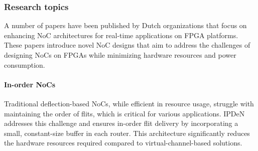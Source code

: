 \subsubsection*{\bf{Research topics}}
A number of papers have been published by Dutch organizations that focus on enhancing NoC architectures for real-time applications on FPGA platforms. %
These papers introduce novel NoC designs that aim to address the challenges of designing NoCs on FPGAs while minimizing hardware resources and power consumption. 
\paragraph{In-order NoCs} Traditional deflection-based NoCs, while efficient in resource usage, struggle with maintaining the order of flits, which is critical for various applications. IPDeN~\cite{IPDeN} addresses this challenge and ensures in-order flit delivery by incorporating a small, constant-size buffer in each router. This architecture  significantly reduces the hardware resources required compared to virtual-channel-based solutions.
